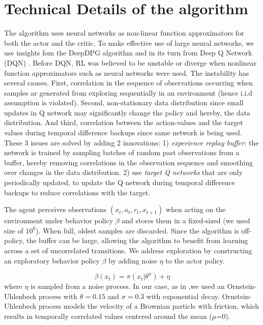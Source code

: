 \section{Technical Details of the algorithm} \label{sec:technical_details}
The algorithm uses neural networks as non-linear function approximators for both the actor and the critic.
To make effective use of large neural networks, we use insights fom the DeepDPG algorithm \cite{Lillicrap2016} and in its turn
from Deep Q Network (DQN) \citep{Mnih2015}.
Before DQN, RL was believed to be unstable or diverge when nonlinear function approximators such as neural networks were used.
The instability has several causes. First, correlation in the sequence of observations occurring when
samples ar generated from exploring sequentially in an environment (hence i.i.d assumption is violated).
Second, non-stationary data distribution since small updates in Q network may significantly change the policy and hereby, the data distribution.
And third, correlation between the action-values and the target values during temporal difference backups since same network is being used.
These 3 issues are solved by adding 2 innovations: 1)  \textit{experience replay buffer}: the network is trained by sampling 
batches of random past observations from a buffer, hereby removing correlations in the observation sequence and smoothing over
changes in the data distribution.
2) use \textit{target Q networks} that are only periodically updated, to update the Q network during temporal difference backups to reduce
correlations with the target.

The agent perceives observations $(x_t,a_t,r_t,x_{t+1})$ when acting on the environment under behavior policy $\beta$ and stores them
in a fixed-sized (we used size of $10^6$). When full, oldest samples are discarded.
Since the algorithm is off-policy, the buffer can be large, allowing the algorithm to benefit from
learning across a set of uncorrelated transitions.
We address exploration by constructing an exploratory behavior policy $\beta$ by adding noise $\eta$ to the actor policy.

\begin{equation}
    \beta(x_t)=\pi(x_t| \theta^\pi) + \eta
\end{equation}
where $\eta$ is sampled from a noise process. In our case, as in \citet{Lillicrap2016},we
used an Ornstein-Uhlenbeck process \citep{Uhlenbeck1930} with $\theta = 0.15$ and $\sigma=0.3$ with exponential decay.
Ornstein-Uhlenbeck process models the velocity of a Brownian particle with friction, which results in temporally correlated
values centered around the mean ($\mu$=0). 

